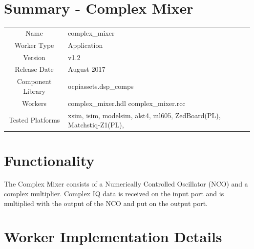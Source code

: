 \documentclass{article}
\author{} %
\date{Version \docVersion} %
\title{\docTitle}
\def\docVersion{1.2}
\def\comp{complex\_mixer}
\def\Comp{Complex Mixer}
\begin{document}
\section*{Summary - \Comp}
\begin{tabular}{|c|M{13.5cm}|}
	\hline
	                  &                                                    \\
	\hline
	Name              & \comp                                              \\
	\hline
	Worker Type       & Application                                        \\
	\hline
	Version           & v\docVersion \\
	\hline
	Release Date      & August 2017 \\
	\hline
	Component Library & ocpiassets.dsp\_comps                              \\
	\hline
	Workers           & \comp.hdl \comp.rcc                                 \\
	\hline
	Tested Platforms  & xsim, isim, modelsim, alst4, ml605, ZedBoard(PL), Matchstiq-Z1(PL), \\
	\hline
\end{tabular}

\section*{Functionality}
\begin{flushleft}
	The Complex Mixer consists of a Numerically Controlled Oscillator (NCO) and a complex multiplier. Complex IQ data is received on the input port and is multiplied with the output of the NCO and put on the output port.
\end{flushleft}

\section*{Worker Implementation Details}
\end{document}
